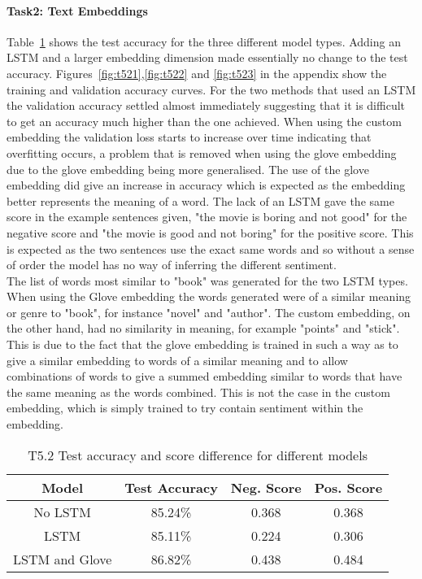 \documentclass[10pt,twocolumn,letterpaper]{article}
\begin{document}
\paragraph{Task2: Text Embeddings}
Table~\ref{table:t52} shows the test accuracy for the three different model types. Adding an LSTM and a larger embedding dimension made essentially no change to the test accuracy. Figures~\ref{fig:t521},\ref{fig:t522} and \ref{fig:t523} in the appendix show the training and validation accuracy curves. For the two methods that used an LSTM the validation accuracy settled almost immediately suggesting that it is difficult to get an accuracy much higher than the one achieved. When using the custom embedding the validation loss starts to increase over time indicating that overfitting occurs, a problem that is removed when using the glove embedding due to the glove embedding being more generalised. The use of the glove embedding did give an increase in accuracy which is expected as the embedding better represents the meaning of a word. The lack of an LSTM gave the same score in the example sentences given, "the movie is boring and not good" for the negative score and "the movie is good and not boring" for the positive score. This is expected as the two sentences use the exact same words and so without a sense of order the model has no way of inferring the different sentiment. \\
The list of words most similar to "book" was generated for the two LSTM types. When using the Glove embedding the words generated were of a similar meaning or genre to "book", for instance "novel" and "author". The custom embedding, on the other hand, had no similarity in meaning, for example "points" and "stick". This is due to the fact that the glove embedding is trained in such a way as to give a similar embedding to words of a similar meaning and to allow combinations of words to give a summed embedding similar to words that have the same meaning as the words combined\cite{slides5}. This is not the case in the custom embedding, which is simply trained to try contain sentiment within the embedding.
\vspace{-0.2cm}
\begin{table}[ht]
    \small
    \centering
    \begin{tabular}{|c|c|c|c|}
        \hline
        Model     & Test Accuracy & Neg. Score & Pos. Score \\
        \hline
        No LSTM & 85.24\%   & 0.368 & 0.368        \\
        LSTM  & 85.11\%  & 0.224 & 0.306         \\
        LSTM and Glove & 86.82\%   &   0.438 & 0.484     \\
        \hline
    \end{tabular}
    \medbreak
    \caption{T5.2 Test accuracy and score difference for different models}
    \vspace{-0.6cm}
    \label{table:t52}
\end{table}
\end{document}
